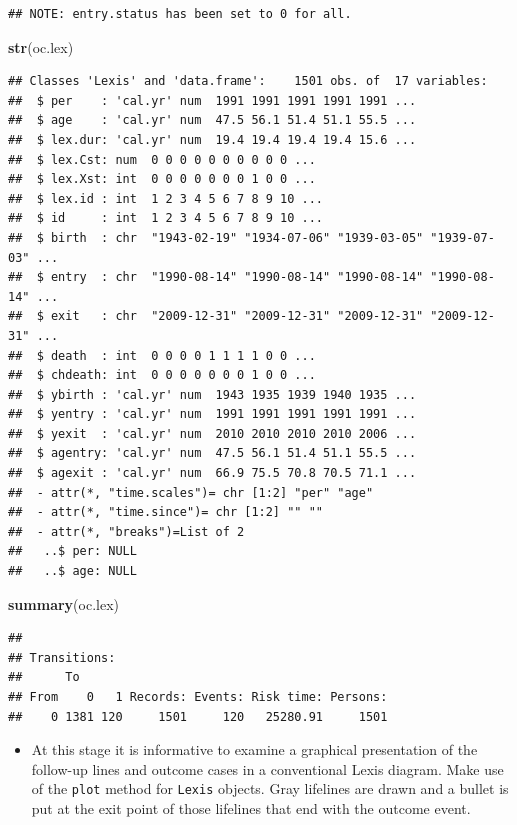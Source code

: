 \documentclass[
]{book}
\newenvironment{Shaded}{\begin{snugshade}}{\end{snugshade}}
\newcommand{\FunctionTok}[1]{\textcolor[rgb]{0.13,0.29,0.53}{\textbf{#1}}}
\newcommand{\NormalTok}[1]{#1}
\providecommand{\tightlist}{%
  \setlength{\itemsep}{0pt}\setlength{\parskip}{0pt}}
\theoremstyle{definition}
\theoremstyle{definition}
\theoremstyle{definition}
\theoremstyle{definition}
\theoremstyle{remark}
\begin{document}
\begin{verbatim}
## NOTE: entry.status has been set to 0 for all.
\end{verbatim}

\begin{Shaded}
\begin{Highlighting}[]
\FunctionTok{str}\NormalTok{(oc.lex)}
\end{Highlighting}
\end{Shaded}

\begin{verbatim}
## Classes 'Lexis' and 'data.frame':    1501 obs. of  17 variables:
##  $ per    : 'cal.yr' num  1991 1991 1991 1991 1991 ...
##  $ age    : 'cal.yr' num  47.5 56.1 51.4 51.1 55.5 ...
##  $ lex.dur: 'cal.yr' num  19.4 19.4 19.4 19.4 15.6 ...
##  $ lex.Cst: num  0 0 0 0 0 0 0 0 0 0 ...
##  $ lex.Xst: int  0 0 0 0 0 0 0 1 0 0 ...
##  $ lex.id : int  1 2 3 4 5 6 7 8 9 10 ...
##  $ id     : int  1 2 3 4 5 6 7 8 9 10 ...
##  $ birth  : chr  "1943-02-19" "1934-07-06" "1939-03-05" "1939-07-03" ...
##  $ entry  : chr  "1990-08-14" "1990-08-14" "1990-08-14" "1990-08-14" ...
##  $ exit   : chr  "2009-12-31" "2009-12-31" "2009-12-31" "2009-12-31" ...
##  $ death  : int  0 0 0 0 1 1 1 1 0 0 ...
##  $ chdeath: int  0 0 0 0 0 0 0 1 0 0 ...
##  $ ybirth : 'cal.yr' num  1943 1935 1939 1940 1935 ...
##  $ yentry : 'cal.yr' num  1991 1991 1991 1991 1991 ...
##  $ yexit  : 'cal.yr' num  2010 2010 2010 2010 2006 ...
##  $ agentry: 'cal.yr' num  47.5 56.1 51.4 51.1 55.5 ...
##  $ agexit : 'cal.yr' num  66.9 75.5 70.8 70.5 71.1 ...
##  - attr(*, "time.scales")= chr [1:2] "per" "age"
##  - attr(*, "time.since")= chr [1:2] "" ""
##  - attr(*, "breaks")=List of 2
##   ..$ per: NULL
##   ..$ age: NULL
\end{verbatim}

\begin{Shaded}
\begin{Highlighting}[]
\FunctionTok{summary}\NormalTok{(oc.lex)}
\end{Highlighting}
\end{Shaded}

\begin{verbatim}
##     
## Transitions:
##      To
## From    0   1 Records: Events: Risk time: Persons:
##    0 1381 120     1501     120   25280.91     1501
\end{verbatim}

\begin{itemize}
\tightlist
\item
  At this stage it is informative to examine a graphical
  presentation of the follow-up lines and outcome cases in a conventional
  Lexis diagram. Make use of the \texttt{plot} method for \texttt{Lexis} objects.
  Gray lifelines are drawn and a bullet is put at the exit point of those lifelines
  that end with the outcome event.
\end{itemize}
\end{document}
